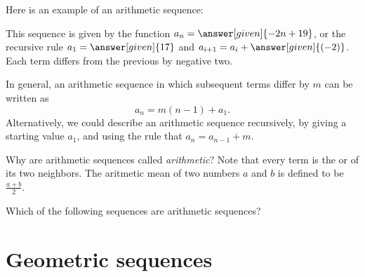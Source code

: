 \documentclass{ximera}
\begin{document}
\begin{example}
  Here is an example of an arithmetic sequence:
  \begin{image}
  \end{image}
  This sequence is given by the function $a_n=\answer[given]{-2n + 19}$, or
  the recursive rule $a_1 = \answer[given]{17}$ and $a_{i+1} = a_i +
  \answer[given]{(-2)}$. Each term differs from the previous by negative
  two.
\end{example}



In general, an arithmetic sequence in which subsequent terms differ
by $m$ can be written as
\[
a_n = m (n-1) + a_1.
\]
Alternatively, we could describe an arithmetic sequence recursively,
by giving a starting value $a_1$, and using the rule that $a_{n} =
a_{n-1} + m$.


\begin{remark}
Why are arithmetic sequences called \textit{arithmetic}?  Note that
every term is the  or  of its two
neighbors.  The aritmetic mean of two numbers $a$ and $b$ is defined
to be $\frac{a+b}{2}$.
\end{remark}



\begin{question}
  Which of the following sequences are arithmetic sequences?
  \begin{selectAll}
    
  \end{selectAll}
\end{question}



\section{Geometric sequences}
\end{document}
